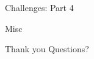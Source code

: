 \documentclass[notes, xcolor = dvipsnames]{beamer}
\begin{document}
    \begin{frame}{Challenges: Part 4}




    \end{frame}

    \begin{frame}{Misc}

    \end{frame}

    \begin{frame}{Thank you}
        Questions?
    \end{frame}
\end{document}
